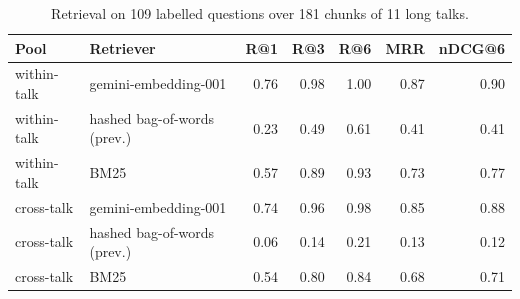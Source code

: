 \begin{table}[t]
\centering
\caption{Retrieval on 109 labelled questions over 181 chunks of 11 long talks.}
\label{tab:retrieval}
\footnotesize
\setlength{\tabcolsep}{3.5pt}
\begin{tabular}{llrrrrr}
\toprule
Pool & Retriever & R@1 & R@3 & R@6 & MRR & nDCG@6 \\
\midrule
within-talk & gemini-embedding-001 & 0.76 & 0.98 & 1.00 & 0.87 & 0.90 \\
within-talk & hashed bag-of-words (prev.) & 0.23 & 0.49 & 0.61 & 0.41 & 0.41 \\
within-talk & BM25 & 0.57 & 0.89 & 0.93 & 0.73 & 0.77 \\
\midrule
cross-talk & gemini-embedding-001 & 0.74 & 0.96 & 0.98 & 0.85 & 0.88 \\
cross-talk & hashed bag-of-words (prev.) & 0.06 & 0.14 & 0.21 & 0.13 & 0.12 \\
cross-talk & BM25 & 0.54 & 0.80 & 0.84 & 0.68 & 0.71 \\
\bottomrule
\end{tabular}
\end{table}
